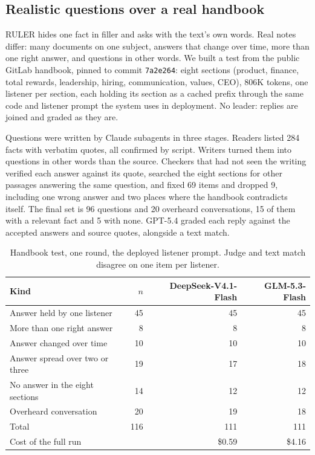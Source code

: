 \documentclass[11pt]{article}
\begin{document}
\subsection{Realistic questions over a real handbook}\label{sec:handbook}

RULER hides one fact in filler and asks with the text's own words. Real notes differ:
many documents on one subject, answers that change over time, more than one right
answer, and questions in other words. We built a test from the public GitLab handbook,
pinned to commit \texttt{7a2e264}: eight sections (product, finance, total rewards,
leadership, hiring, communication, values, CEO), 806K tokens, one listener per section,
each holding its section as a cached prefix through the same code and listener prompt
the system uses in deployment. No leader: replies are joined and graded as they are.

Questions were written by Claude subagents in three stages. Readers listed 284 facts
with verbatim quotes, all confirmed by script. Writers turned them into questions in
other words than the source. Checkers that had not seen the writing verified each answer
against its quote, searched the eight sections for other passages answering the same
question, and fixed 69 items and dropped 9, including one wrong answer and two places
where the handbook contradicts itself. The final set is 96 questions and 20 overheard
conversations, 15 of them with a relevant fact and 5 with none. GPT-5.4 graded each
reply against the accepted answers and source quotes, alongside a text match.

\begin{table}[h]
\centering
\begin{tabular}{lrrr}
\toprule
Kind & $n$ & DeepSeek-V4.1-Flash & GLM-5.3-Flash \\
\midrule
Answer held by one listener            & 45 & 45 & 45 \\
More than one right answer             &  8 &  8 &  8 \\
Answer changed over time               & 10 & 10 & 10 \\
Answer spread over two or three        & 19 & 17 & 18 \\
No answer in the eight sections        & 14 & 12 & 12 \\
Overheard conversation                 & 20 & 19 & 18 \\
\midrule
Total                                  & 116 & 111 & 111 \\
Cost of the full run                   &     & \$0.59 & \$4.16 \\
\bottomrule
\end{tabular}
\caption{Handbook test, one round, the deployed listener prompt. Judge and text match
disagree on one item per listener.}
\end{table}
\end{document}
